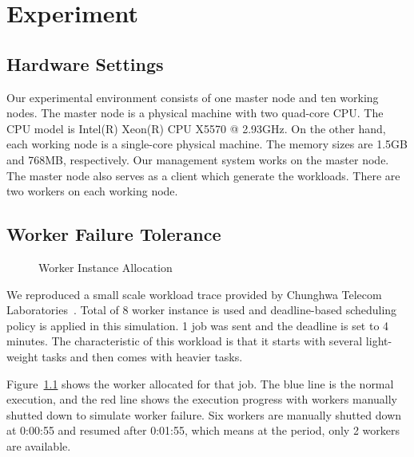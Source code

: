 \chapter{Experiment}\label{sec:exp}

\section{Hardware Settings}

Our experimental environment consists of one master node and ten working nodes.
The master node is a physical machine with two quad-core CPU.
The CPU model is Intel(R) Xeon(R) CPU X5570 @ 2.93GHz.
On the other hand, each working node is a single-core physical machine.
The memory sizes are 1.5GB and 768MB, respectively.
Our management system works on the master node.
The master node also serves as a client which generate the workloads.
There are two workers on each working node.

\section{Worker Failure Tolerance}

\begin{figure}
  \caption{Worker Instance Allocation}
  \label{figure:worker-failure}
\end{figure}

We reproduced a small scale workload trace provided by Chunghwa Telecom
Laboratories~\cite{cite:CHT}.
Total of 8 worker instance is used and deadline-based scheduling policy
is applied in this simulation. 
1 job was sent and the deadline is set to 4 minutes.
The characteristic of this workload is that it starts with several
light-weight tasks and then comes with heavier tasks.

Figure~\ref{figure:worker-failure} shows the worker allocated for that
job.
The blue line is the normal execution, and the red line shows the
execution progress with workers manually shutted down to simulate worker
failure.
Six workers are manually shutted down at 0:00:55 and resumed after
0:01:55, which means at the period, only 2 workers are available.

